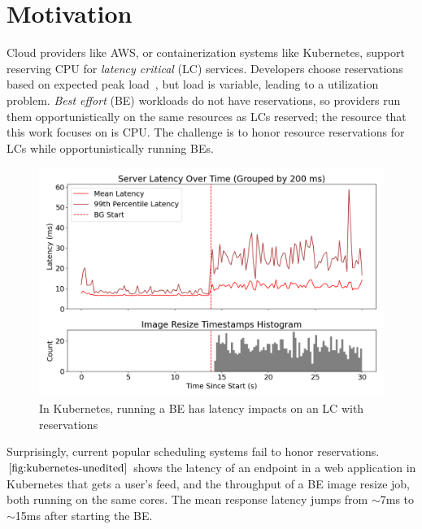 \section{Motivation}

Cloud providers like AWS, or containerization systems like Kubernetes, support
reserving CPU for \textit{latency critical} (LC) services. Developers choose
reservations based on expected peak load~\cite{borg, nu, overprovision}, but
load is variable, leading to a utilization problem. \textit{Best effort} (BE)
workloads do not have reservations, so providers run them opportunistically on
the same resources as LCs reserved; the resource that this work focuses on is
CPU. The challenge is to honor resource reservations for LCs while
opportunistically running BEs.

\begin{figure}[t]
    \centering
    \includegraphics[width=\columnwidth]{graphs/kubernetes-unedited.png}
    \caption{In Kubernetes, running a BE has latency impacts on an LC with
    reservations}\label{fig:kubernetes-unedited}
\end{figure}

Surprisingly, current popular scheduling systems fail to honor reservations.
$\autoref{fig:kubernetes-unedited}$ shows the latency of an endpoint in a web
application in Kubernetes that gets a user's feed, and the throughput of a BE
image resize job, both running on the same cores. The mean response latency
jumps from $\sim$7ms to $\sim$15ms after starting the BE.



